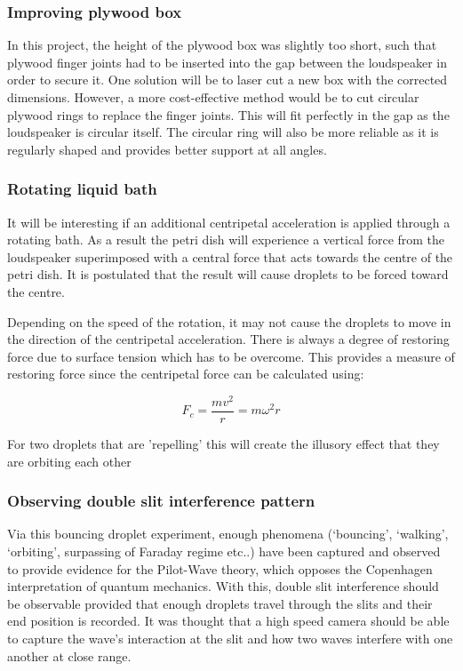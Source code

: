 \subsubsection{Improving plywood box}
In this project, the height of the plywood box was slightly too short, such that plywood finger joints had to be inserted into the gap between the loudspeaker in order to secure it. One solution will be to laser cut a new box with the corrected dimensions. However, a more cost-effective method would be to cut circular plywood rings to replace the finger joints. This will fit perfectly in the gap as the loudspeaker is circular itself. The circular ring will also be more reliable as it is regularly shaped and provides better support at all angles.

\subsubsection{Rotating liquid bath}
It will be interesting if an additional centripetal acceleration is applied through a rotating bath. As a result the petri dish will experience a vertical force from the loudspeaker superimposed with a central force that acts towards the centre of the petri dish. It is postulated that the result will cause droplets to be forced toward the centre.

Depending on the speed of the rotation, it may not cause the droplets to move in the direction of the centripetal acceleration. There is always a degree of restoring force due to surface tension which has to be overcome. This provides a measure of restoring force since the centripetal force can be calculated using:

$$F_c = \frac{mv^2}{r} = m \omega^2 r$$ 

For two droplets that are 'repelling' this will create the illusory effect that they are orbiting each other

\subsubsection{Observing double slit interference pattern}
Via this bouncing droplet experiment, enough phenomena (`bouncing', `walking', `orbiting', surpassing of Faraday regime etc..) have been captured and observed to provide evidence for the Pilot-Wave theory, which opposes the Copenhagen interpretation of quantum mechanics. With this, double slit interference should be observable provided that enough droplets travel through the slits and their end position is recorded. It was thought that a high speed camera should be able to capture the wave's interaction at the slit and how two waves interfere with one another at close range.

